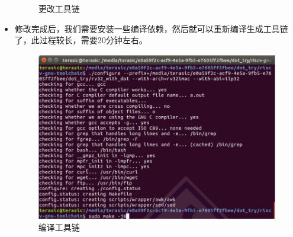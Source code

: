 \documentclass[a4paper, 14pt, oneside]{book} %
\numberwithin{equation}{subsection}
\begin{document}
\begin{itemize}
\begin{figure}[H]
					\caption{更改工具链}
				\end{figure}
			\item 修改完成后，我们需要安装一些编译依赖，然后就可以重新编译生成工具链了，此过程较长，需要20分钟左右。
				\begin{figure}[H]
					\centering  
					\includegraphics[scale=0.8]{img/COMPILE.JPG} 
					\caption{编译工具链}
				\end{figure}
		\end{itemize}
		
\end{document}
